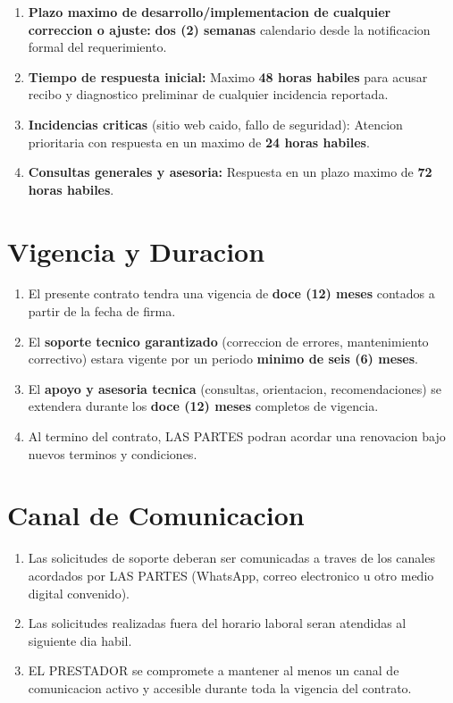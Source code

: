 \documentclass[12pt,a4paper]{article}
\begin{document}
\begin{enumerate}[label=\textbf{\color{pink}\arabic*.}, leftmargin=2em, itemsep=0.4em]
  \item \textbf{Plazo maximo de desarrollo/implementacion de cualquier correccion o ajuste:} \textbf{dos (2) semanas} calendario desde la notificacion formal del requerimiento.
  \item \textbf{Tiempo de respuesta inicial:} Maximo \textbf{48 horas habiles} para acusar recibo y diagnostico preliminar de cualquier incidencia reportada.
  \item \textbf{Incidencias criticas} (sitio web caido, fallo de seguridad): Atencion prioritaria con respuesta en un maximo de \textbf{24 horas habiles}.
  \item \textbf{Consultas generales y asesoria:} Respuesta en un plazo maximo de \textbf{72 horas habiles}.
\end{enumerate}

\section{Vigencia y Duracion}

\begin{enumerate}[label=\textbf{\color{pink}\arabic*.}, leftmargin=2em, itemsep=0.4em]
  \item El presente contrato tendra una vigencia de \textbf{doce (12) meses} contados a partir de la fecha de firma.
  \item El \textbf{soporte tecnico garantizado} (correccion de errores, mantenimiento correctivo) estara vigente por un periodo \textbf{minimo de seis (6) meses}.
  \item El \textbf{apoyo y asesoria tecnica} (consultas, orientacion, recomendaciones) se extendera durante los \textbf{doce (12) meses} completos de vigencia.
  \item Al termino del contrato, LAS PARTES podran acordar una renovacion bajo nuevos terminos y condiciones.
\end{enumerate}

\section{Canal de Comunicacion}

\begin{enumerate}[label=\textbf{\alph*)}, leftmargin=2em, itemsep=0.3em]
  \item Las solicitudes de soporte deberan ser comunicadas a traves de los canales acordados por LAS PARTES (WhatsApp, correo electronico u otro medio digital convenido).
  \item Las solicitudes realizadas fuera del horario laboral seran atendidas al siguiente dia habil.
  \item EL PRESTADOR se compromete a mantener al menos un canal de comunicacion activo y accesible durante toda la vigencia del contrato.
\end{enumerate}
\end{document}
